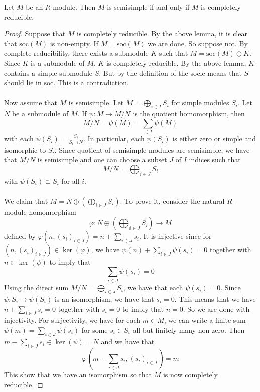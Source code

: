 \documentclass[a4paper]{article}
\begin{document}
\begin{thm}{}{} Let $M$ be an $R$-module. Then $M$ is semisimple if and only if $M$ is completely reducible. 
\begin{proof}
Suppose that $M$ is completely reducible. By the above lemma, it is clear that $\text{soc}(M)$ is non-empty. If $M=\text{soc}(M)$ we are done. So suppose not. By complete reducibility, there exists a submodule $K$ such that $M=\text{soc}(M)\oplus K$. Since $K$ is a submodule of $M$, $K$ is completely reducible. By the above lemma, $K$ contains a simple submodule $S$. But by the definition of the socle means that $S$ should lie in $\text{soc}$. This is a contradiction. \\~\\

Now assume that $M$ is semisimple. Let $M=\bigoplus_{i\in I}S_i$ for simple modules $S_i$. Let $N$ be a submodule of $M$. If $\psi:M\to M/N$ is the quotient homomorphism, then $$M/N=\psi(M)=\sum_{\in I}\psi(M)$$ with each $\psi(S_i)=\frac{S_i}{S_i\cap N}$. In particular, each $\psi(S_i)$ is either zero or simple and isomorphic to $S_i$. Since quotient of semisimple modules are semisimple, we have that $M/N$ is semisimple and one can choose a subset $J$ of $I$ indices such that $$M/N=\bigoplus_{i\in J} S_i$$ with $\psi(S_i)\cong S_i$ for all $i$. \\~\\

We claim that $M=N\oplus\left(\bigoplus_{i\in J}S_i\right)$. To prove it, consider the natural $R$-module homomorphism $$\varphi:N\oplus\left(\bigoplus_{i\in J}S_i\right)\to M$$ defined by $\varphi(n,(s_i)_{i\in J})=n+\sum_{i\in J}s_i$. It is injective since for $(n,(s_i)_{i\in J})\in\ker(\varphi)$, we have $\psi(n)+\sum_{i\in J}\psi(s_i)=0$ together with $n\in\ker(\psi)$ to imply that $$\sum_{i\in J}\psi(s_i)=0$$ Using the direct sum $M/N=\bigoplus_{i\in J} S_i$, we have that each $\psi(s_i)=0$. Since $\psi:S_i\to\psi(S_i)$ is an isomorphism, we have that $s_i=0$. This means that we have $n+\sum_{i\in J}s_i=0$ together with $s_i=0$ to imply that $n=0$. So we are done with injectivity. For surjectivity, we have for each $m\in M$, we can write a finite sum $\psi(m)=\sum_{i\in J}\psi(s_i)$ for some $s_i\in S_i$ all but finitely many non-zero. Then $m-\sum_{i\in J}s_i\in\ker(\psi)=N$ and we have that $$\varphi\left(m-\sum_{i\in J}s_i,(s_i)_{i\in J}\right)=m$$ This show that we have an isomorphism so that $M$ is now completely reducible. 
\end{proof}
\end{thm}
\end{document}
